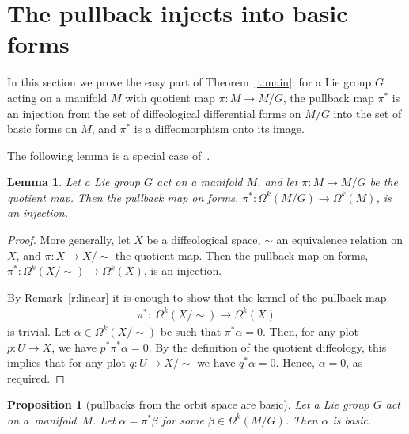 \documentclass[pdftex]{sigma}
\numberwithin{equation}{section}
\newtheorem{Lemma}[Theorem]{Lemma}
\newtheorem{Proposition}[Theorem]{Proposition}
\newcommand{\hypref}[2]{{#2~\ref{#1}}}
\begin{document}
\section{The pullback injects into basic forms}\label{sec:injects}

In this section we prove the easy part of Theorem~\ref{t:main}:
for a Lie group $G$ acting on a manifold $M$
with quotient map $\pi \colon M \to M/G$,
the pullback map $\pi^*$ is an injection
from the set of dif\/feological dif\/ferential forms on $M/G$
into the set of basic forms on $M$,
and $\pi^*$ is a dif\/feomorphism onto its image.

The following lemma is a special case of~\cite[Section~6.39]{iglesias}.

\begin{Lemma} \label{l:pullback is injection}
Let a Lie group $G$ act on a manifold $M$,
and let $\pi \colon M \to M/G$ be the quotient map.
Then the pullback map on forms,
$\pi^* \colon \Omega^k(M/G) \to \Omega^k(M)$, is an injection.
\end{Lemma}



\begin{proof}
More generally, let $X$ be a dif\/feological space, $\sim$ an equivalence
relation on $X$, and $\pi \colon X \to X/\!\!\sim$ the quotient map.
Then the pullback map on forms,
$\pi^* \colon \Omega^k(X/\!\!\sim) \to \Omega^k(X)$, is an injection.

By \hypref{r:linear}{Remark} it is enough to show that
the kernel of the pullback map
\begin{gather*}\pi^* \colon \ \Omega^k(X/\!\!\sim) \to \Omega^k(X)\end{gather*}
is trivial.
Let $\alpha \in \Omega^k(X/\!\!\sim)$
be such that $\pi^* \alpha = 0$.
Then, for any plot $p \colon U \to X$, we have $p^* \pi^* \alpha= 0$.
By the def\/inition of the quotient dif\/feology, this implies that
for any plot $q \colon U \to X/\!\!\sim$ we have $q^* \alpha = 0$.
Hence, $\alpha = 0$, as required.
\end{proof}

\begin{Proposition}[pullbacks from the orbit space are basic]
\label{p:pullbacksarebasic}
Let a Lie group $G$ act on a~mani\-fold~$M$.
Let $\alpha = \pi^*\beta$ for some $\beta \in \Omega^k(M/G)$.
Then $\alpha$ is basic.
\end{Proposition}
\end{document}
